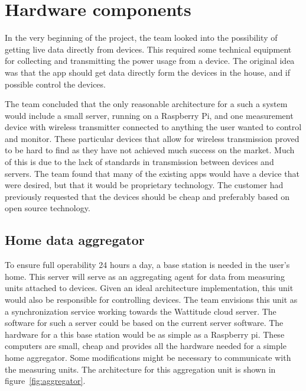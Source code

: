 \section{Hardware components}
\label{sec:hardwareComponents}
In the very beginning of the project, the team looked into the possibility of getting live data directly from devices. This required some technical equipment for collecting and transmitting the power usage from a device. The original idea was that the app should get data directly form the devices in the house, and if possible control the devices.

The team concluded that the only reasonable architecture for a such a system would include a small server, running on a Raspberry Pi, and one measurement device with wireless transmitter connected to anything the user wanted to control and monitor. These particular devices that allow for wireless transmission proved to be hard to find as they have not achieved much success on the market. Much of this is due to the lack of standards in transmission between devices and servers. The team found that many of the existing apps would have a device that were desired, but that it would be proprietary technology. The customer had previously requested that the devices should be cheap and preferably based on open source technology.

\subsection{Home data aggregator}
To ensure full operability 24 hours a day, a base station is needed in the user's home. This server will serve as an aggregating agent for data from measuring units attached to devices. Given an ideal architecture implementation, this unit would also be responsible for controlling devices. The team envisions this unit as a synchronization service working towards the Wattitude cloud server. The software for such a server could be based on the current server software. The hardware for a this base station would be as simple as a Raspberry pi\cite{pi}. These computers are small, cheap and provides all the hardware needed for a simple home aggregator. Some modifications might be necessary to communicate with the measuring units. The architecture for this aggregation unit is shown in figure~\ref{fig:aggregator}.

